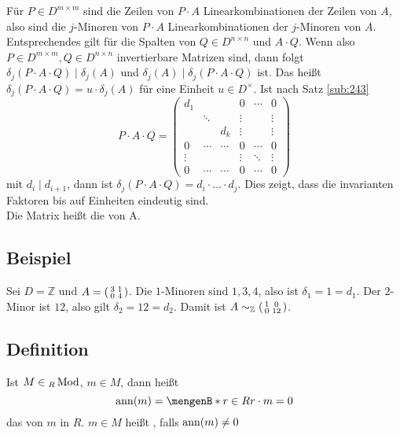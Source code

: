 Für $P \in D^{m \times m}$ sind die Zeilen von $P \cdot A$ Linearkombinationen der 
Zeilen von $A$, also sind die $j$-Minoren von $P \cdot A$ Linearkombinationen der $j$-Minoren von $A$. Entsprechendes gilt für die Spalten von $Q \in D^{n \times n}$ und 
$A \cdot Q$. Wenn also $P \in D^{m \times m}, Q \in D^{n \times n}$ invertierbare Matrizen sind, dann folgt $\delta_j (P \cdot A \cdot Q) \mid \delta_j (A)$ und 
$\delta_j(A) \mid \delta_j (P \cdot A \cdot Q)$ ist. Das heißt $\delta_j (P \cdot A \cdot Q) = u \cdot \delta_j(A)$ für eine Einheit $u \in D^\times$. Ist nach Satz 
\ref{sub:243}
\[
	P \cdot A \cdot Q = \begin{pmatrix}
		d_1 & & & 0 & \cdots & 0\\
		& \ddots & & \vdots  & & \vdots \\
		& & d_k & \vdots& & \vdots \\
		0 & \cdots & \cdots & 0 & \cdots & 0 \\
		\vdots & & & \vdots & \ddots & \vdots \\
		0 & \cdots & \cdots & 0 & \cdots & 0
	\end{pmatrix}
\] 
mit $d_i \mid d_{i+1}$, dann ist $\delta_j(P \cdot A \cdot Q) = d_i \cdot \ldots \cdot d_j$. Dies zeigt, dass die invarianten Faktoren bis auf Einheiten eindeutig sind.
\bewende\\
Die Matrix heißt die  von A. 

\subsection[Beispiel: Anwendung des Elementarteilersatzes]{Beispiel} %
\label{sub:246}
Sei $D= \mathds{Z}$ und $A = \begin{psmallmatrix}
	3 & 1 \\
	0 & 4
\end{psmallmatrix}$. Die $1$-Minoren sind $1,3,4$, also ist $\delta_1 = 1 = d_1$. Der $2$-Minor ist $12$, also gilt $\delta_2=12= d_2$. Damit ist 
$A \sim_\mathds{Z} \begin{psmallmatrix}
	1 & 0 \\
	0 & 12
\end{psmallmatrix}$.

\subsection[Definition: Annulatorideal und Torsionselement]{Definition} %
\label{sub:247}
Ist $M \in {_R\Mod}$, $m \in M$, dann heißt 
\[
	\ann(m) = \set[r \in R]{r \cdot m = 0} 
\]
das  von $m$ in $R$. $m \in M$ heißt , falls $\ann(m) \not= 0$  

